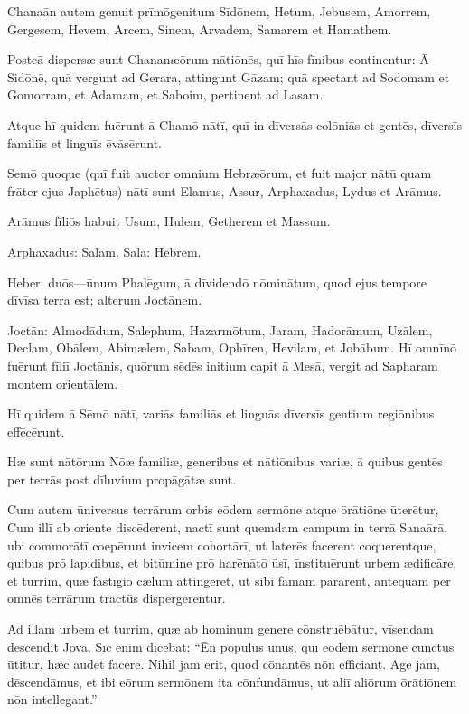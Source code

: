 \Versus Chanaān autem genuit prīmōgenitum Sīdōnem, Hetum,
\Versus Jebusem, Amorrem, Gergesem,
\Versus Hevem, Arcem, Sinem,
\Versus Arvadem, Samarem et Hamathem.

Posteā dispersæ sunt Chananæōrum nātiōnēs,
\Versus quī hīs fīnibus continentur: Ā Sidōnē, quā vergunt ad Gerara, attingunt Gāzam; quā spectant ad Sodomam et Gomorram, et Adamam, et Saboim, pertinent ad Lasam.

\Versus Atque hī quidem fuērunt ā Chamō nātī, quī in dīversās colōniās et gentēs, dīversīs familiīs et linguīs ēvāsērunt.

\Versus Semō quoque (quī fuit auctor omnium Hebræōrum, et fuit major nātū quam frāter ejus Japhētus)
\Versus nātī sunt Elamus, Assur, Arphaxadus, Lydus et Arāmus.

\Versus Arāmus fīliōs habuit Usum, Hulem, Getherem et Massum.

\Versus Arphaxadus: Salam. Sala: Hebrem.
	
\Versus Heber: duōs—ūnum Phalēgum, ā dīvidendō nōminātum, quod ejus tempore dīvīsa terra est; alterum Joctānem.

\Versus Joctān: Almodādum, Salephum, Hazarmōtum, Jaram,
\Versus Hadorāmum, Uzālem, Declam,
\Versus Obālem, Abimælem, Sabam, Ophīren, Hevilam, et Jobābum. Hī omnīnō fuērunt fīliī Joctānis,
\Versus quōrum sēdēs initium capit ā Mesā, vergit ad Sapharam montem orientālem.

\Versus Hī quidem ā Sēmō nātī, variās familiās et linguās dīversīs gentium regiōnibus effēcērunt.

\Versus Hæ sunt nātōrum Nōæ familiæ, generibus et nātiōnibus variæ, ā quibus gentēs per terrās post dīluvium propāgātæ sunt.



\Caput
\Versus Cum autem ūniversus terrārum orbis eōdem sermōne atque ōrātiōne ūterētur,
\Versus Cum illī ab oriente discēderent, nactī sunt quemdam campum in terrā Sanaārā, ubi commorātī
\Versus coepērunt invicem cohortārī, ut laterēs facerent coquerentque, quibus prō lapidibus, et bitūmine prō harēnātō ūsī,
\Versus īnstituērunt urbem ædificāre, et turrim, quæ fastīgiō cælum attingeret, ut sibi fāmam parārent, antequam per omnēs terrārum tractūs dispergerentur.

\Versus Ad illam urbem et turrim, quæ ab hominum genere cōnstruēbātur, vīsendam dēscendit Jōva.
\Versus Sīc enim dīcēbat: ``Ēn populus ūnus, quī eōdem sermōne cūnctus ūtitur, hæc audet facere. Nihil jam erit, quod cōnantēs nōn efficiant.
\Versus Age jam, dēscendāmus, et ibi eōrum sermōnem ita cōnfundāmus, ut aliī aliōrum ōrātiōnem nōn intellegant.''

